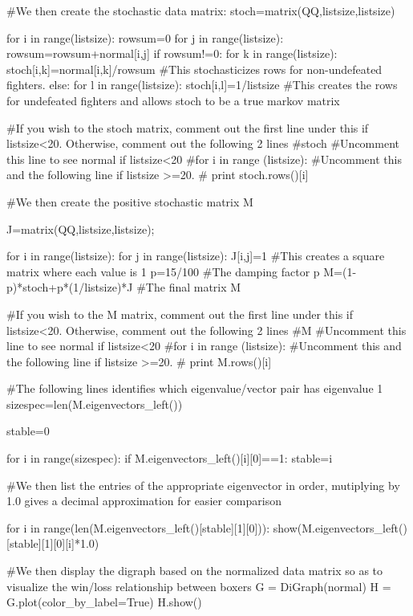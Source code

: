 \documentclass{ximera}
\begin{document}
\begin{sageCell}
            
#We then create the stochastic data matrix:
stoch=matrix(QQ,listsize,listsize)
    
for i in range(listsize):
    rowsum=0
    for j in range(listsize):
        rowsum=rowsum+normal[i,j]
    if rowsum!=0:
        for k in range(listsize):
            stoch[i,k]=normal[i,k]/rowsum #This stochasticizes rows for non-undefeated fighters.
    else:
        for l in range(listsize):
            stoch[i,l]=1/listsize #This creates the rows for undefeated fighters and allows stoch to be a true markov matrix

#If you wish to the stoch matrix, comment out the first line under this if listsize<20.  Otherwise, comment out the following 2 lines
#stoch #Uncomment this line to see normal if listsize<20
#for i in range (listsize): #Uncomment this and the following line if listsize >=20.
#    print stoch.rows()[i]

#We then create the positive stochastic matrix M

J=matrix(QQ,listsize,listsize);

for i in range(listsize):
    for j in range(listsize):
        J[i,j]=1 #This creates a square matrix where each value is 1
p=15/100 #The damping factor p
M=(1-p)*stoch+p*(1/listsize)*J #The final matrix M

#If you wish to the M matrix, comment out the first line under this if listsize<20.  Otherwise, comment out the following 2 lines
#M #Uncomment this line to see normal if listsize<20
#for i in range (listsize): #Uncomment this and the following line if listsize >=20.
#    print M.rows()[i]


#The following lines identifies which eigenvalue/vector pair has eigenvalue 1
sizespec=len(M.eigenvectors_left())

stable=0

for i in range(sizespec):
    if M.eigenvectors_left()[i][0]==1:
        stable=i

        
#We then list the entries of the appropriate eigenvector in order, mutiplying by 1.0 gives a decimal approximation for easier comparison
        
for i in range(len(M.eigenvectors_left()[stable][1][0])):
    show(M.eigenvectors_left()[stable][1][0][i]*1.0)
    

#We then display the digraph based on the normalized data matrix so as to visualize the win/loss relationship between boxers    
G = DiGraph(normal)
H = G.plot(color_by_label=True)
H.show()\end{sageCell}
\end{document}
